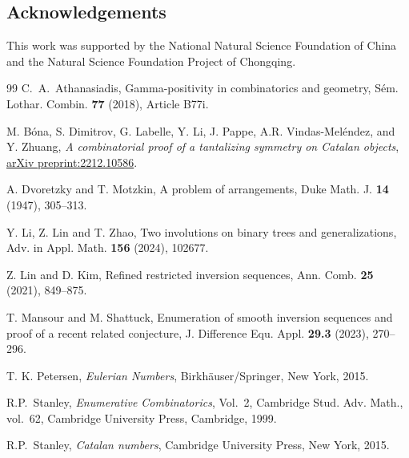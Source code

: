 \documentclass[reqno]{amsart}
\numberwithin{equation}{section}
\theoremstyle{definition}
\theoremstyle{named}
\begin{document}
\subsection*{Acknowledgements}

This work was supported by the National Natural Science Foundation of China and the Natural Science Foundation Project of Chongqing.

\begin{thebibliography}{99}
	C.~A.~Athanasiadis, Gamma-positivity in combinatorics and geometry, S\'{e}m. Lothar. Combin. {\bf 77} (2018), Article B77i.

	M. B\'ona, S. Dimitrov, G. Labelle, Y. Li, J. Pappe, A.R. Vindas-Mel\'endez, and Y. Zhuang, {\it A combinatorial proof of a tantalizing symmetry on Catalan objects}, \href{https://arxiv.org/abs/2212.10586}{arXiv preprint:2212.10586}.

	A. Dvoretzky and T. Motzkin, A problem of arrangements, Duke Math. J. {\bf 14} (1947), 305--313.
	
	 Y. Li, Z. Lin and T. Zhao, Two involutions on binary trees and generalizations, Adv. in Appl. Math. {\bf 156} (2024), 102677.

	Z. Lin and D. Kim, Refined restricted inversion sequences, Ann. Comb. {\bf 25} (2021), 849--875.
	
	T. Mansour and M. Shattuck, Enumeration of smooth inversion sequences and proof of a recent related conjecture, J. Difference Equ. Appl. {\bf 29.3} (2023), 270--296.
	
	T. K. Petersen, \textit{Eulerian Numbers}, Birkh\"auser/Springer, New York, 2015.
	
  R.P.~Stanley, \textit{Enumerative Combinatorics}, Vol.~2, Cambridge Stud. Adv. Math., vol.~62, Cambridge University Press, Cambridge, 1999.

  R.P.~Stanley, \textit{Catalan numbers}, Cambridge University Press, New York, 2015.
	
	

\end{thebibliography}
\end{document}
